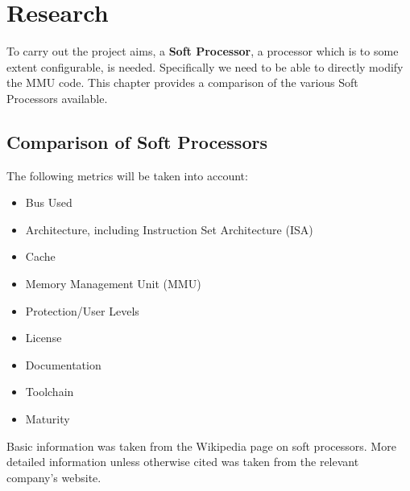 \chapter{Research}
\label{cha:res}

To carry out the project aims, a \textbf{Soft Processor}, a processor which is to some extent configurable, is needed. Specifically we need to be able to directly modify the MMU code. This chapter provides a comparison of the various Soft Processors available.

\section{Comparison of Soft Processors}
The following metrics will be taken into account:
\begin{itemize}
\item Bus Used
\item Architecture, including Instruction Set Architecture (ISA)
\item Cache
\item Memory Management Unit (MMU)
\item Protection/User Levels
\item License
\item Documentation
\item Toolchain
\item Maturity
\end{itemize}

Basic information was taken from the Wikipedia page on soft processors.\cite{wiki-sp} More detailed information unless otherwise cited was taken from the relevant company's website.\cite{or1k-home}\cite{leon-home}\cite{lm32-home}\cite{mb-home}\cite{nios-home}\cite{m1-home}

